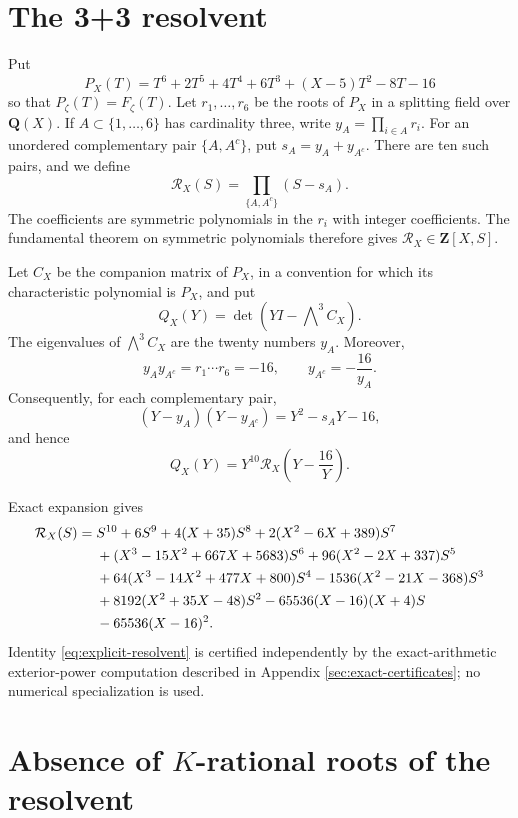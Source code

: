 \section{The 3+3 resolvent}

Put
\[
 P_X(T)=T^6+2T^5+4T^4+6T^3+(X-5)T^2-8T-16
\]
so that $P_\zeta(T)=F_\zeta(T)$.  Let $r_1,\ldots,r_6$ be the roots of
$P_X$ in a splitting field over $\mathbf Q(X)$.  If
$A\subset\{1,\ldots,6\}$ has cardinality three,
write $y_A=\prod_{i\in A}r_i$.  For an unordered complementary pair
$\{A,A^c\}$, put $s_A=y_A+y_{A^c}$.  There are ten such pairs, and we
define
\[
 \mathcal R_X(S)=\prod_{\{A,A^c\}}(S-s_A).
\]
The coefficients are symmetric polynomials in the $r_i$ with integer
coefficients.
The fundamental theorem on symmetric polynomials therefore gives
$\mathcal R_X\in\mathbf Z[X,S]$.

Let $C_X$ be the companion matrix of $P_X$, in a convention for which
its characteristic polynomial is $P_X$, and put
\[
 Q_X(Y)=\det\!\left(YI-\bigwedge\nolimits^3C_X\right).
\]
The eigenvalues of $\bigwedge^3C_X$ are the twenty numbers $y_A$.
Moreover,
\[
 y_Ay_{A^c}=r_1\cdots r_6=-16,
 \qquad
 y_{A^c}=-\frac{16}{y_A}.
\]
Consequently, for each complementary pair,
\[
 (Y-y_A)(Y-y_{A^c})=Y^2-s_AY-16,
\]
and hence
\begin{equation}\label{eq:exterior-resolvent}
 Q_X(Y)=Y^{10}\mathcal R_X\!\left(Y-\frac{16}{Y}\right).
\end{equation}

Exact expansion gives
\begin{align}
\mathcal R_X(S)={}&S^{10}+6S^9+4(X+35)S^8
 +2(X^2-6X+389)S^7\notag\\
& +(X^3-15X^2+667X+5683)S^6
 +96(X^2-2X+337)S^5\notag\\
& +64(X^3-14X^2+477X+800)S^4
 -1536(X^2-21X-368)S^3\notag\\
& +8192(X^2+35X-48)S^2
 -65536(X-16)(X+4)S\notag\\
& -65536(X-16)^2.
\label{eq:explicit-resolvent}
\end{align}
Identity \eqref{eq:explicit-resolvent} is certified independently by
the exact-arithmetic exterior-power computation described in Appendix
\ref{sec:exact-certificates}; no numerical specialization is used.

\section{Absence of \texorpdfstring{$K$}{K}-rational roots of the resolvent}

